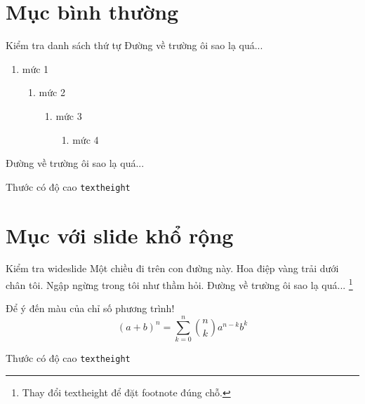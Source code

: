 \documentclass[
	style=\style,
	clock,
	size=11pt,
	paper=screen,
	orient=landscape
]{powerdot}
\makeatletter
\def\textheightrule{\raisebox\baselineskip{\rule{1cm}\pd@@textheight}}
\makeatother
\begin{document}
\section{Mục bình thường}

\begin{slide}{Kiểm tra danh sách thứ tự}
  Đường về trường ôi sao lạ quá...
  \pause
  \begin{enumerate}[type=1]
    \item mức 1\pause
    \begin{enumerate}
      \item mức 2\pause
      \begin{enumerate}
        \item mức 3\pause
        \begin{enumerate}
          \item mức 4
        \end{enumerate}
      \end{enumerate}
    \end{enumerate}
  \end{enumerate}
  Đường về trường ôi sao lạ quá...
\end{slide}

\begin{slide}{Thước có độ cao \texttt{textheight}}
  \textheightrule
\end{slide}

\section[template=wideslide]{Mục với slide khổ rộng}

\begin{wideslide}{Kiểm tra wideslide}
  Một chiều đi trên con đường này. Hoa điệp vàng trải dưới chân tôi.
  Ngập ngừng trong tôi như thầm hỏi. Đường về trường ôi sao lạ quá...
  \footnote{Thay đổi textheight để đặt footnote đúng chỗ.}

  Để ý đến màu của chỉ số phương trình!
  \begin{equation}
    (a+b)^n=\sum_{k=0}^n{n\choose k}a^{n-k}b^k
  \end{equation}
\end{wideslide}

\begin{wideslide}{Thước có độ cao \texttt{textheight}}
  \textheightrule
\end{wideslide}
\end{document}
